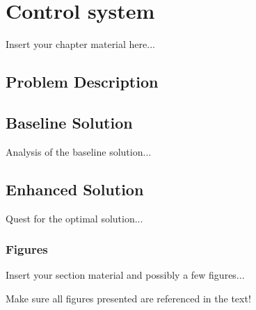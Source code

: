 
\chapter{Control system}
\label{chapter:controlsystem}

Insert your chapter material here...


\section{Problem Description}
\label{section:problem}

\section{Baseline Solution}
\label{section:baseline}

Analysis of the baseline solution...


\section{Enhanced Solution}
\label{section:enhanced}

Quest for the optimal solution...


\subsection{Figures}
\label{subsection:figures}

Insert your section material and possibly a few figures...

Make sure all figures presented are referenced in the text!

